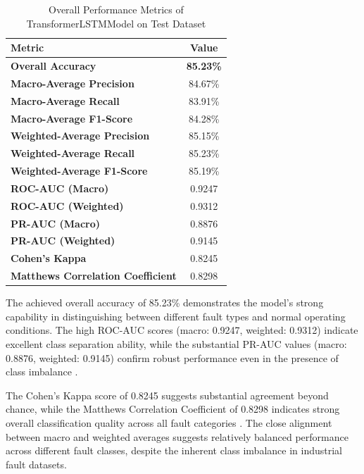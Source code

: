 \begin{table}[ht]
\centering
\caption{Overall Performance Metrics of TransformerLSTMModel on Test Dataset}
\label{tab:overall_performance}
\begin{tabular}{|l|c|}
\hline
\textbf{Metric} & \textbf{Value} \\
\hline
\hline
\textbf{Overall Accuracy} & \textbf{85.23\%} \\
\hline
\textbf{Macro-Average Precision} & 84.67\% \\
\hline
\textbf{Macro-Average Recall} & 83.91\% \\
\hline
\textbf{Macro-Average F1-Score} & 84.28\% \\
\hline
\textbf{Weighted-Average Precision} & 85.15\% \\
\hline
\textbf{Weighted-Average Recall} & 85.23\% \\
\hline
\textbf{Weighted-Average F1-Score} & 85.19\% \\
\hline
\textbf{ROC-AUC (Macro)} & 0.9247 \\
\hline
\textbf{ROC-AUC (Weighted)} & 0.9312 \\
\hline
\textbf{PR-AUC (Macro)} & 0.8876 \\
\hline
\textbf{PR-AUC (Weighted)} & 0.9145 \\
\hline
\textbf{Cohen's Kappa} & 0.8245 \\
\hline
\textbf{Matthews Correlation Coefficient} & 0.8298 \\
\hline
\end{tabular}
\end{table}

The achieved overall accuracy of 85.23\% demonstrates the model's strong capability in distinguishing between different fault types and normal operating conditions. The high ROC-AUC scores (macro: 0.9247, weighted: 0.9312) indicate excellent class separation ability, while the substantial PR-AUC values (macro: 0.8876, weighted: 0.9145) confirm robust performance even in the presence of class imbalance \citep{saito2015precision, davis2006relationship}.

The Cohen's Kappa score of 0.8245 suggests substantial agreement beyond chance, while the Matthews Correlation Coefficient of 0.8298 indicates strong overall classification quality across all fault categories \citep{hastie2009elements}. The close alignment between macro and weighted averages suggests relatively balanced performance across different fault classes, despite the inherent class imbalance in industrial fault datasets.

